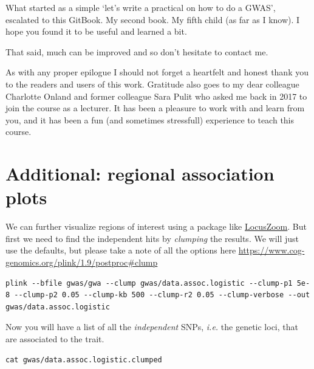 \documentclass[
]{book}
\newenvironment{Shaded}{\begin{snugshade}}{\end{snugshade}}
\newcommand{\CommentTok}[1]{\textcolor[rgb]{0.56,0.35,0.01}{\textit{#1}}}
\newcommand{\FunctionTok}[1]{\textcolor[rgb]{0.00,0.00,0.00}{#1}}
\newcommand{\NormalTok}[1]{#1}
\newcommand{\OperatorTok}[1]{\textcolor[rgb]{0.81,0.36,0.00}{\textbf{#1}}}
\newcommand{\StringTok}[1]{\textcolor[rgb]{0.31,0.60,0.02}{#1}}
\newcommand{\VariableTok}[1]{\textcolor[rgb]{0.00,0.00,0.00}{#1}}
\begin{document}
What started as a simple `let's write a practical on how to do a GWAS', escalated to this GitBook. My second book. My fifth child (as far as I know). I hope you found it to be useful and learned a bit.

That said, much can be improved and so don't hesitate to contact me.

As with any proper epilogue I should not forget a heartfelt and honest thank you to the readers and users of this work. Gratitude also goes to my dear colleague Charlotte Onland and former colleague Sara Pulit who asked me back in 2017 to join the course as a lecturer. It has been a pleasure to work with and learn from you, and it has been a fun (and sometimes stressfull) experience to teach this course.

\hypertarget{add_chapter_regional_plot}{%
\chapter{Additional: regional association plots}\label{add_chapter_regional_plot}}

We can further visualize regions of interest using a package like \href{http://locuszoom.org}{LocusZoom}. But first we need to find the independent hits by \emph{clumping} the results. We will just use the defaults, but please take a note of all the options here \url{https://www.cog-genomics.org/plink/1.9/postproc\#clump}

\begin{verbatim}
plink --bfile gwas/gwa --clump gwas/data.assoc.logistic --clump-p1 5e-8 --clump-p2 0.05 --clump-kb 500 --clump-r2 0.05 --clump-verbose --out gwas/data.assoc.logistic
\end{verbatim}

Now you will have a list of all the \emph{independent} SNPs, \emph{i.e.} the genetic loci, that are associated to the trait.

\begin{verbatim}
cat gwas/data.assoc.logistic.clumped
\end{verbatim}

\begin{Shaded}
\end{Shaded}
\end{document}
